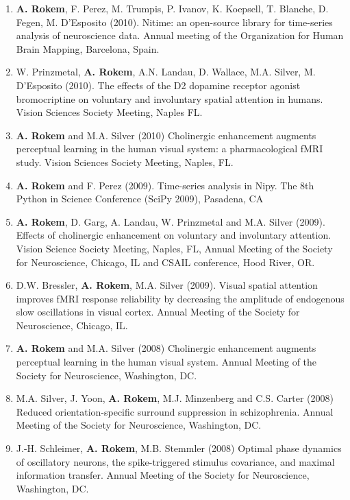 \documentclass[11pt,fullpage]{article}
\begin{document}
\begin{enumerate}
\item {\bf A. Rokem}, F. Perez, M. Trumpis, P. Ivanov, K. Koepsell, T. Blanche, D. Fegen, M. D'Esposito (2010). Nitime: an open-source library for time-series analysis of neuroscience data. Annual meeting of the Organization for Human Brain Mapping, Barcelona, Spain.

\item W. Prinzmetal, {\bf A. Rokem}, A.N. Landau, D. Wallace, M.A. Silver, M. D’Esposito (2010). The effects of the D2 dopamine receptor agonist bromocriptine on voluntary and involuntary spatial attention in humans. Vision Sciences Society Meeting, Naples FL.

\item {\bf A. Rokem} and M.A. Silver (2010) Cholinergic enhancement augments perceptual learning in the human visual system: a pharmacological fMRI study. Vision Sciences Society Meeting, Naples, FL.

\item {\bf A. Rokem} and F. Perez (2009). Time-series analysis in Nipy. The 8th Python in Science Conference (SciPy 2009), Pasadena, CA

\item {\bf A. Rokem}, D. Garg, A. Landau, W. Prinzmetal and M.A. Silver (2009). Effects of cholinergic enhancement on voluntary and involuntary attention. Vision Science Society Meeting, Naples, FL, Annual Meeting of the Society for Neuroscience, Chicago, IL and CSAIL conference, Hood River, OR.

\item D.W. Bressler, {\bf A. Rokem}, M.A. Silver (2009). Visual spatial attention improves fMRI response reliability by decreasing the amplitude of endogenous slow oscillations in visual cortex. Annual Meeting of the Society for Neuroscience, Chicago, IL.

\item {\bf A. Rokem} and M.A. Silver (2008) Cholinergic enhancement augments perceptual learning in the human visual system. Annual Meeting of the Society for Neuroscience, Washington, DC.

\item M.A. Silver, J. Yoon, {\bf A. Rokem}, M.J. Minzenberg and C.S. Carter (2008) Reduced orientation-specific surround suppression in schizophrenia. Annual Meeting of the Society for Neuroscience, Washington, DC.

\item J.-H. Schleimer, {\bf A. Rokem}, M.B. Stemmler (2008) Optimal phase dynamics of oscillatory neurons, the spike-triggered stimulus covariance, and maximal information transfer. Annual Meeting of the Society for Neuroscience, Washington, DC.


\end{enumerate}
\end{document}
